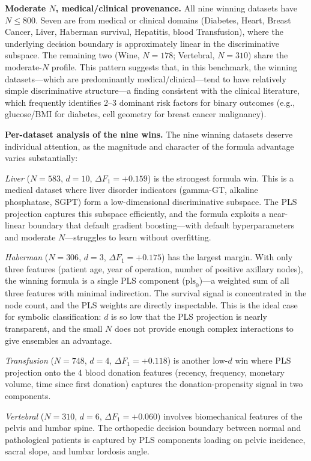\documentclass[journal]{IEEEtran}
\begin{document}
\textbf{Moderate $N$, medical/clinical provenance.}
All nine winning datasets have $N \leq 800$.  Seven are from
medical or clinical domains (Diabetes, Heart, Breast Cancer, Liver,
Haberman survival, Hepatitis, blood Transfusion), where the
underlying decision boundary is approximately linear in the
discriminative subspace.  The remaining two (Wine, $N = 178$;
Vertebral, $N = 310$) share the moderate-$N$ profile.  This pattern
suggests that, in this benchmark, the winning datasets---which are predominantly medical/clinical---tend to have relatively simple
discriminative structure---a finding consistent with the clinical
literature, which frequently identifies 2--3 dominant risk factors
for binary outcomes (e.g., glucose/BMI for diabetes, cell geometry
for breast cancer malignancy).

\textbf{Per-dataset analysis of the nine wins.}
The nine winning datasets deserve individual attention, as the
magnitude and character of the formula advantage varies
substantially:

\emph{Liver} ($N = 583$, $d = 10$, $\Delta F_1 = +0.159$) is the
strongest formula win.  This is a medical dataset where liver
disorder indicators (gamma-GT, alkaline phosphatase, SGPT) form a
low-dimensional discriminative subspace.  The PLS projection
captures this subspace efficiently, and the formula exploits a
near-linear boundary that default gradient boosting---with default
hyperparameters and moderate $N$---struggles to learn without
overfitting.

\emph{Haberman} ($N = 306$, $d = 3$, $\Delta F_1 = +0.175$) has the
largest margin.  With only three features (patient age, year of
operation, number of positive axillary nodes), the winning formula
is a single PLS component ($\mathrm{pls}_0$)---a weighted sum of
all three features with minimal indirection.  The survival signal
is concentrated in the node count, and the PLS weights are directly
inspectable.  This is the ideal case for symbolic classification:
$d$ is so low that the PLS projection is nearly transparent, and
the small $N$ does not provide enough complex interactions to give
ensembles an advantage.

\emph{Transfusion} ($N = 748$, $d = 4$, $\Delta F_1 = +0.118$) is
another low-$d$ win where PLS projection onto the 4 blood donation
features (recency, frequency, monetary volume, time since first
donation) captures the donation-propensity signal in two components.

\emph{Vertebral} ($N = 310$, $d = 6$, $\Delta F_1 = +0.060$)
involves biomechanical features of the pelvis and lumbar spine.  The
orthopedic decision boundary between normal and pathological
patients is captured by PLS components loading on pelvic incidence,
sacral slope, and lumbar lordosis angle.
\end{document}
